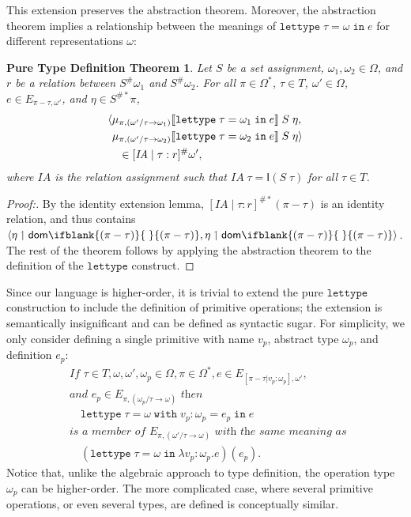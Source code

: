 \documentclass[sigplan,screen,nonacm,balance=false]{acmart}
\theoremstyle{plain}
\DeclarePairedDelimiter{\pair}{\langle}{\rangle}
\DeclarePairedDelimiter{\interp}{\llbracket}{\rrbracket}
\newcommand{\lettype}{\mathtt{lettype}}
\newcommand{\lettypein}[3]{\mathtt{lettype} \; #1 = #2 \; \mathtt{in} \; #3}
\newcommand{\letwith}[6]{\mathtt{lettype} \; #1 = #2 \; \mathtt{with} \; #3 : #4 = #5 \; \mathtt{in} \; #6}
\newcommand{\dom}[1]{\mathsf{dom}\ifblank{#1}{\;}{#1}}
\newcommand{\IA}{\mathit{IA}}
\newcommand{\Id}{\mathsf{I}}
\begin{document}
This extension preserves the abstraction theorem.
Moreover, the abstraction theorem implies a relationship between the meanings of $\lettypein{\tau}{\omega}{e}$ for different representations $\omega$:

\newtheorem{puretypedef}{Pure Type Definition Theorem}
\begin{puretypedef}
Let $S$ be a set assignment, $\omega_1, \omega_2 \in \Omega$, and $r$ be a relation between $S^\# \omega_1$ and $S^\# \omega_2$.
For all $\pi \in \Omega^*$, $\tau \in T$, $\omega' \in \Omega$, $e \in E_{\pi - \tau, \omega'}$, and $\eta \in S^{\#*} \pi$,
%
\begin{align*}
  &\pair{\mu_{\pi, (\omega'/\tau \to \omega_1)} \interp{\lettypein{\tau}{\omega_1}{e}} \; S \; \eta, \\
  &\phantom{\langle} \mu_{\pi, (\omega'/\tau \to \omega_2)} \interp{\lettypein{\tau}{\omega_2}{e}} \; S \; \eta} \\
  &\quad \in [\IA \mid \tau : r]^\# \omega',
\end{align*}
%
where $\IA$ is the relation assignment such that $\IA \; \tau = \Id(S \; \tau)$ for all $\tau \in T$.
\end{puretypedef}

\begin{proof}[Proof:\nopunct]
  By the identity extension lemma, $[\IA \mid \tau : r]^{\#*} (\pi - \tau)$ is an identity relation, and thus contains $\pair{\eta \upharpoonleft \dom{(\pi - \tau)}, \eta \upharpoonleft \dom{(\pi - \tau)}}$.
  The rest of the theorem follows by applying the abstraction theorem to the definition of the $\lettype$ construct.
\end{proof}

Since our language is higher-order, it is trivial to extend the pure $\lettype$ construction to include the definition of primitive operations; the extension is semantically insignificant and can be defined as syntactic sugar.
For simplicity, we only consider defining a single primitive with name $v_p$, abstract type $\omega_p$, and definition $e_p$:
\begin{align*}
  & \textit{If } \tau \in T, \omega, \omega', \omega_p \in \Omega, \pi \in \Omega^*, e \in E_{[\pi - \tau | v_p : \omega_p], \omega'}, \\
  & \textit{and } e_p \in E_{\pi, (\omega_p/\tau \to \omega)} \textit{ then } \\
  & \quad \letwith{\tau}{\omega}{v_p}{\omega_p}{e_p}{e} \\
  & \textit{is a member of } E_{\pi, (\omega'/\tau \to \omega)} \textit{ with the same meaning as } \\
  & \quad (\lettypein{\tau}{\omega}{\lambda v_p : \omega_p . e})(e_p).
\end{align*}
%
Notice that, unlike the algebraic approach to type definition, the operation type $\omega_p$ can be higher-order.
The more complicated case, where several primitive operations, or even several types, are defined is conceptually similar.
\end{document}
